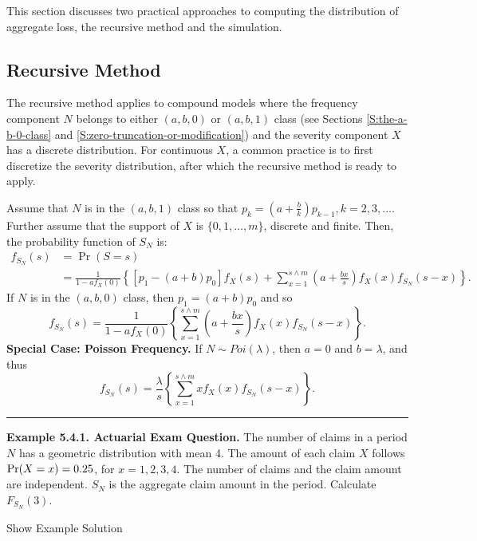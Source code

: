 \documentclass[]{book}
\theoremstyle{definition}
\theoremstyle{definition}
\theoremstyle{definition}
\theoremstyle{remark}
\begin{document}
This section discusses two practical approaches to computing the
distribution of aggregate loss, the recursive method and the simulation.

\subsection{Recursive Method}\label{recursive-method}

The recursive method applies to compound models where the frequency
component \(N\) belongs to either \((a,b,0)\) or \((a,b,1)\) class (see
Sections \ref{S:the-a-b-0-class} and
\ref{S:zero-truncation-or-modification}) and the severity component
\(X\) has a discrete distribution. For continuous \(X\), a common
practice is to first discretize the severity distribution, after which
the recursive method is ready to apply.

Assume that \(N\) is in the \((a,b,1)\) class so that
\(p_{k}=\left( a+\frac{b}{k} \right) p_{k-1}, k = 2,3,\ldots\). Further
assume that the support of \(X\) is \(\{0,1,\ldots,m\}\), discrete and
finite. Then, the probability function of \(S_N\) is: \[\begin{aligned}
f_{S_N}(s)&=\Pr (S=s) \\
&=\frac{1}{1-af_{X}(0)}\left\{ \left[ p_1 -(a+b)p_{0}\right]
f_X (s)+\sum_{x=1}^{s\wedge m}\left( a+\frac{bx}{s} \right) f_X (x)f_{S_N}(s-x)\right\}.
\end{aligned}\] If \(N\) is in the \((a,b,0)\) class, then
\(p_1=(a+b)p_0\) and so \[
f_{S_N}(s)=\frac{1}{1-af_X (0)}\left\{ \sum_{x=1}^{s\wedge m}\left( a+\frac{bx
}{s}\right) f_X (x)f_{S_N}(s-x)\right\}.
\] \textbf{Special Case: Poisson Frequency.} If \(N \sim Poi(\lambda)\),
then \(a=0\) and \(b=\lambda\), and thus \[
f_{S_N}(s)=\frac{\lambda }{s}\left\{ \sum_{x=1}^{s \wedge
m} x f_X (x) f_{S_N} (s-x)\right\} .
\]

\begin{center}\rule{0.5\linewidth}{\linethickness}\end{center}

\textbf{Example 5.4.1. Actuarial Exam Question.} The number of claims in
a period \(N\) has a geometric distribution with mean 4. The amount of
each claim \(X\) follows \({\rm Pr} (X = x) = 0.25\), for
\(x = 1,2,3,4\). The number of claims and the claim amount are
independent. \(S_N\) is the aggregate claim amount in the period.
Calculate \(F_{S_N}(3)\).

Show Example Solution
\end{document}
